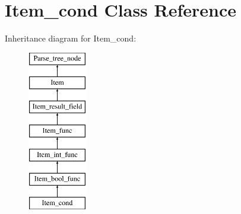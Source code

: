\hypertarget{classItem__cond}{}\section{Item\+\_\+cond Class Reference}
\label{classItem__cond}
Inheritance diagram for Item\+\_\+cond\+:\begin{figure}[H]
\begin{center}
\leavevmode
\includegraphics[height=7.000000cm]{classItem__cond}
\end{center}
\end{figure}
